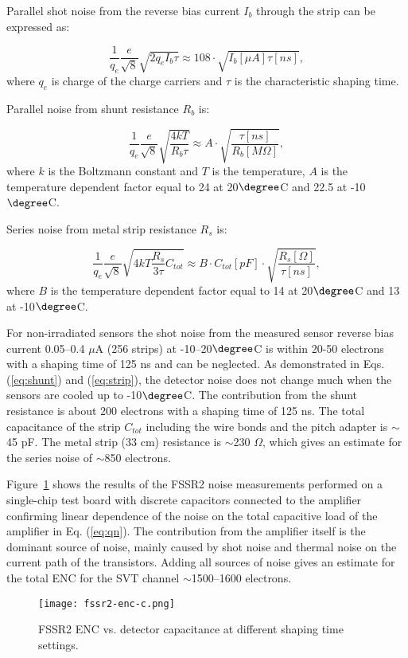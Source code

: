 Parallel shot noise from the reverse bias current $I_b$ through the strip can be expressed as:

\begin{equation} \frac{1}{q_e}\frac{e}{\sqrt{8}}\sqrt{2q_eI_b\tau} \approx 108\cdot\sqrt{I_b[\mu A]\tau [ns]}  \label{eq:bias},
\end{equation}
where $q_e$ is charge of the charge carriers and $\tau$ is the characteristic shaping time.

Parallel noise from shunt resistance $R_b$ is:

\begin{equation} \frac{1}{q_e}\frac{e}{\sqrt{8}}\sqrt{\frac{4kT}{R_b\tau}} \approx A\cdot\sqrt{\frac{\tau [ns]}{R_b[M \Omega]}} \label{eq:shunt},
\end{equation}
where $k$ is the Boltzmann constant and $T$ is the temperature, $A$ is the temperature dependent factor equal to 24 at 20$\degree$C and 22.5 at -10$\degree$C.

Series noise from metal strip resistance $R_s$ is:

\begin{equation} \frac{1}{q_e}\frac{e}{\sqrt{8}}\sqrt{4kT\frac{R_s}{3\tau}C_{tot}} \approx B\cdot C_{tot}[pF]\cdot\sqrt{\frac{R_s[\Omega]}{\tau [ns]}} \label{eq:strip},
\end{equation}
where $B$ is the temperature dependent factor equal to 14 at 20$\degree$C and 13 at -10$\degree$C.

For non-irradiated sensors the shot noise from the measured sensor reverse bias current 0.05--0.4 $\mu$A (256 strips) at -10--20$\degree$C is within 20-50 electrons with a shaping time of 125 ns and can be neglected. As demonstrated in Eqs. (\ref{eq:shunt}) and (\ref{eq:strip}), the detector noise does not change much when the sensors are cooled up to -10$\degree$C. The contribution from the shunt resistance is about 200 electrons with a shaping time of 125 ns. The total capacitance of the strip $C_{tot}$ including the wire bonds and the pitch adapter is $\sim$45 pF. The metal strip (33 cm) resistance is $\sim$230 $\Omega$, which gives an estimate for the series noise of $\sim$850 electrons.

Figure~\ref{fig:fssr2-enc-c} shows the results of the FSSR2 noise measurements performed on a single-chip test board with discrete capacitors connected to the amplifier confirming linear dependence of the noise on the total capacitive load of the amplifier in Eq. (\ref{eq:qn}). The contribution from the amplifier itself is the dominant source of noise, mainly caused by shot noise and thermal noise on the current path of the transistors. Adding all sources of noise gives an estimate for the total ENC for the SVT channel $\sim$1500--1600 electrons.

\begin{figure}[hbt] 
\centering 
\texttt{[image: fssr2-enc-c.png]}
\caption{FSSR2 ENC vs. detector capacitance at different shaping time settings.}
\label{fig:fssr2-enc-c}
\end{figure}
